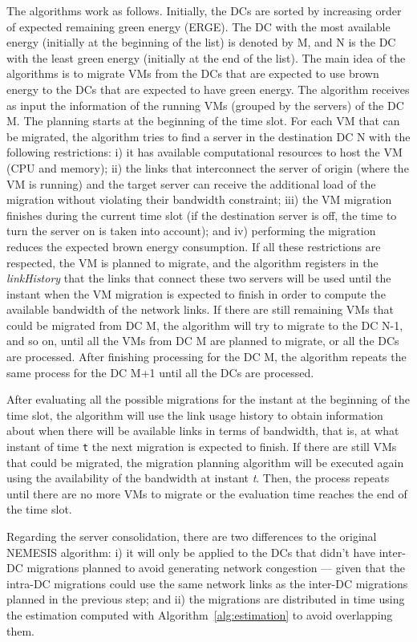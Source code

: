 The algorithms work as follows. Initially, the DCs are sorted by increasing order of expected remaining green energy (ERGE). The DC with the most available energy (initially at the beginning of the list) is denoted by M, and N is the DC with the least green energy (initially at the end of the list). The main idea of the algorithms is to migrate VMs from the DCs that are expected to use brown energy to the DCs that are expected to have green energy. The algorithm receives as input the information of the running VMs (grouped by the servers) of the DC M. The planning starts at the beginning of the time slot. For each VM that can be migrated, the algorithm tries to find a server in the destination DC N with the following restrictions: i) it has available computational resources to host the VM (CPU and memory); ii) the links that interconnect the server of origin (where the VM is running) and the target server can receive the additional load of the migration without violating their bandwidth constraint; iii) the VM migration finishes during the current time slot (if the destination server is off, the time to turn the server on is taken into account); and iv) performing the migration reduces the expected brown energy consumption. If all these restrictions are respected, the VM is planned to migrate, and the algorithm registers in the \textit{linkHistory} that the links that connect these two servers will be used until the instant when the VM migration is expected to finish in order to compute the available bandwidth of the network links. If there are still remaining VMs that could be migrated from DC M, the algorithm will try to migrate to the DC N-1, and so on, until all the VMs from DC M are planned to migrate, or all the DCs are processed. After finishing processing for the DC M, the algorithm repeats the same process for the DC M+1 until all the DCs are processed. 

After evaluating all the possible migrations for the instant at the beginning of the time slot, the algorithm will use the link usage history to obtain information about when there will be available links in terms of bandwidth, that is, at what instant of time \texttt{t} the next migration is expected to finish.  If there are still VMs that could be migrated, the migration planning algorithm will be executed again using the availability of the bandwidth at instant \textit{t}. Then, the process repeats until there are no more VMs to migrate or the evaluation time reaches the end of the time slot.

Regarding the server consolidation, there are two differences to the original NEMESIS algorithm: i) it will only be applied to the DCs that didn't have inter-DC migrations planned to avoid generating network congestion --- given that the intra-DC migrations could use the same network links as the inter-DC migrations planned in the previous step; and ii) the migrations are distributed in time using the estimation computed with Algorithm~\ref{alg:estimation} to avoid overlapping them.

